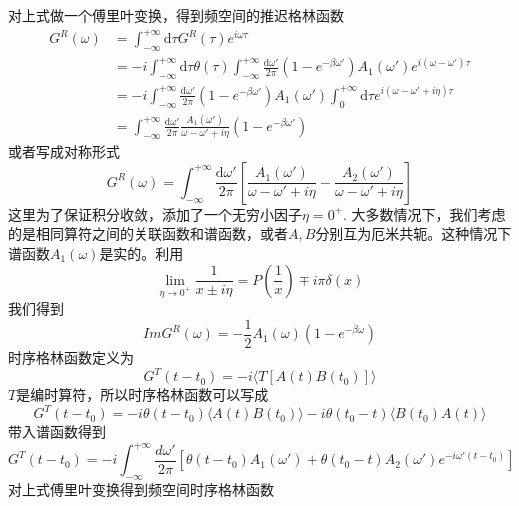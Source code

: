 \documentclass{article}
\numberwithin{equation}{subsection}
\begin{document}
对上式做一个傅里叶变换，得到频空间的推迟格林函数
\begin{equation}
    \begin{split}
        G^{R}(\omega)&=\int_{-\infty}^{+\infty}\mathrm{d}\tau G^R(\tau)e^{i\omega\tau}\\
        &=-i\int_{-\infty}^{+\infty}\mathrm{d}\tau\theta(\tau)\int_{-\infty}^{+\infty}\frac{\mathrm{d}\omega'}{2\pi}(1-e^{-\beta\omega'})A_1(\omega')e^{i(\omega-\omega')\tau}\\
        &=-i\int_{-\infty}^{+\infty}\frac{\mathrm{d}\omega'}{2\pi}(1-e^{-\beta\omega'})A_1(\omega')\int_{0}^{+\infty}\mathrm{d}\tau e^{i(\omega-\omega'+i\eta)\tau}\\
        &=\int_{-\infty}^{+\infty}\frac{\mathrm{d}\omega'}{2\pi}\frac{A_1(\omega')}{\omega-\omega'+i\eta}(1-e^{-\beta\omega'})
    \end{split}
\end{equation}
或者写成对称形式
\begin{equation}
    G^R(\omega)=\int_{-\infty}^{+\infty}\frac{\mathrm{d}\omega'}{2\pi}\left[\frac{A_1(\omega')}{\omega-\omega'+i\eta}-\frac{A_2(\omega')}{\omega-\omega'+i\eta}\right]
\end{equation}
这里为了保证积分收敛，添加了一个无穷小因子$\eta=0^+$. 大多数情况下，我们考虑的是相同算符之间的关联函数和谱函数，或者$A,B$分别互为厄米共轭。这种情况下谱函数$A_1(\omega)$是实的。利用
\begin{equation}
    \lim_{\eta\to 0^+}\frac{1}{x\pm i\eta}=P(\frac{1}{x})\mp i\pi\delta(x)
\end{equation}
我们得到
\begin{equation}
    Im G^R(\omega)=-\frac{1}{2}A_1(\omega)(1-e^{-\beta\omega})
\end{equation}
时序格林函数定义为
\begin{equation}
    G^T(t-t_0)=-i\langle T[A(t)B(t_0)]\rangle
\end{equation}
$T$是编时算符，所以时序格林函数可以写成
\begin{equation}
    G^T(t-t_0)=-i\theta(t-t_0)\langle A(t)B(t_0)\rangle-i\theta(t_0-t)\langle B(t_0)A(t)\rangle
\end{equation}
带入谱函数得到
\begin{equation}
    G^T(t-t_0)=-i\int_{-\infty}^{+\infty}\frac{d\omega'}{2\pi}\left[\theta(t-t_0)A_1(\omega')+\theta(t_0-t)A_2(\omega')e^{-i\omega'(t-t_0)}\right]
\end{equation}
对上式傅里叶变换得到频空间时序格林函数
\end{document}
